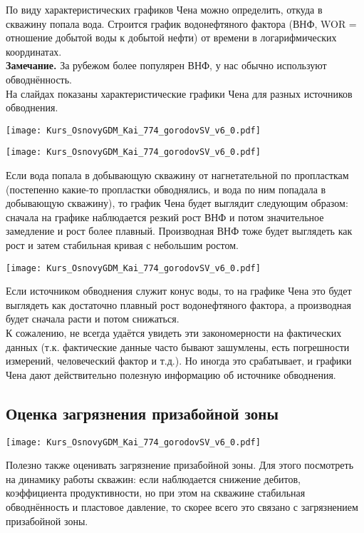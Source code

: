 \documentclass[main.tex]{subfiles}
\begin{document}
По виду характеристических графиков Чена можно определить, откуда в скважину попала вода.
Строится график водонефтяного фактора (ВНФ, WOR = отношение добытой воды к добытой нефти) от времени в логарифмических координатах.
\\

\textbf{Замечание.} За рубежом более популярен ВНФ, у нас обычно используют обводнённость.
\\

На слайдах показаны характеристические графики Чена для разных источников обводнения.

\texttt{[image: Kurs\_OsnovyGDM\_Kai\_774\_gorodovSV\_v6\_0.pdf]}

\texttt{[image: Kurs\_OsnovyGDM\_Kai\_774\_gorodovSV\_v6\_0.pdf]}

Если вода попала в добывающую скважину от нагнетательной по пропласткам (постепенно какие-то пропластки обводнялись, и вода по ним попадала в добывающую скважину), то график Чена будет выглядит следующим образом: сначала на графике наблюдается резкий рост ВНФ и потом значительное замедление и рост более плавный.
Производная ВНФ тоже будет выглядеть как рост и затем стабильная кривая с небольшим ростом.

\texttt{[image: Kurs\_OsnovyGDM\_Kai\_774\_gorodovSV\_v6\_0.pdf]}

Если источником обводнения служит конус воды, то на графике Чена это будет выглядеть как достаточно плавный рост водонефтяного фактора, а производная будет сначала расти и потом снижаться.
\\

К сожалению, не всегда удаётся увидеть эти закономерности на фактических данных (т.к. фактические данные часто бывают зашумлены, есть погрешности измерений, человеческий фактор и т.д.).
Но иногда это срабатывает, и графики Чена дают действительно полезную информацию об источнике обводнения.

\subsection{Оценка загрязнения призабойной зоны}

\texttt{[image: Kurs\_OsnovyGDM\_Kai\_774\_gorodovSV\_v6\_0.pdf]}

Полезно также оценивать загрязнение призабойной зоны.
Для этого посмотреть на динамику работы скважин: если наблюдается снижение дебитов, коэффициента продуктивности, но при этом на скважине стабильная обводнённость и пластовое давление, то скорее всего это связано с загрязнением призабойной зоны.
\\
\end{document}
